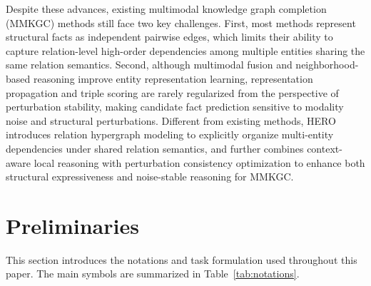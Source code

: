 \documentclass[pdflatex,sn-mathphys-num]{sn-jnl}
\begin{document}
Despite these advances, existing multimodal knowledge graph completion (MMKGC) methods still face two key challenges. First, most methods represent structural facts as independent pairwise edges, which limits their ability to capture relation-level high-order dependencies among multiple entities sharing the same relation semantics. Second, although multimodal fusion and neighborhood-based reasoning improve entity representation learning, representation propagation and triple scoring are rarely regularized from the perspective of perturbation stability, making candidate fact prediction sensitive to modality noise and structural perturbations. Different from existing methods, HERO introduces relation hypergraph modeling to explicitly organize multi-entity dependencies under shared relation semantics, and further combines context-aware local reasoning with perturbation consistency optimization to enhance both structural expressiveness and noise-stable reasoning for MMKGC.

\section{Preliminaries}
\label{sec:preliminaries}
This section introduces the notations and task formulation used throughout this paper. The main symbols are summarized in Table~\ref{tab:notations}.
\end{document}
